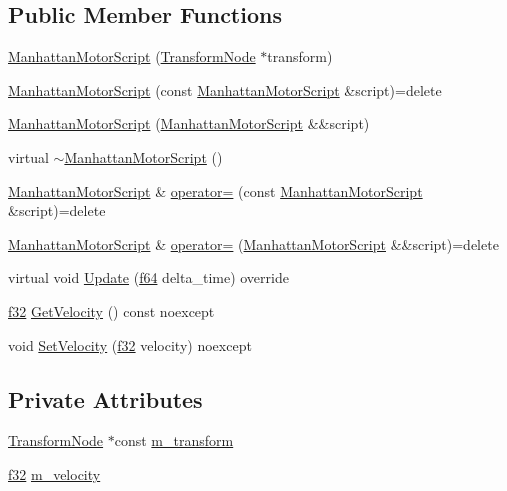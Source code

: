 \subsection*{Public Member Functions}
\begin{DoxyCompactItemize}
\item 
\hyperlink{classmage_1_1_manhattan_motor_script_a6a40360d3b1603e8e5fc64a230ed7574}{Manhattan\+Motor\+Script} (\hyperlink{structmage_1_1_transform_node}{Transform\+Node} $\ast$transform)
\item 
\hyperlink{classmage_1_1_manhattan_motor_script_a890f4456d4707e6eb33e43837b26e536}{Manhattan\+Motor\+Script} (const \hyperlink{classmage_1_1_manhattan_motor_script}{Manhattan\+Motor\+Script} \&script)=delete
\item 
\hyperlink{classmage_1_1_manhattan_motor_script_ae573b594372f184a524c6c9f35517fae}{Manhattan\+Motor\+Script} (\hyperlink{classmage_1_1_manhattan_motor_script}{Manhattan\+Motor\+Script} \&\&script)
\item 
virtual \hyperlink{classmage_1_1_manhattan_motor_script_a86d4f8c4ba0aa94358ea2bc77f9a2a69}{$\sim$\+Manhattan\+Motor\+Script} ()
\item 
\hyperlink{classmage_1_1_manhattan_motor_script}{Manhattan\+Motor\+Script} \& \hyperlink{classmage_1_1_manhattan_motor_script_a563d4d429bbcabf25f57539857dde53c}{operator=} (const \hyperlink{classmage_1_1_manhattan_motor_script}{Manhattan\+Motor\+Script} \&script)=delete
\item 
\hyperlink{classmage_1_1_manhattan_motor_script}{Manhattan\+Motor\+Script} \& \hyperlink{classmage_1_1_manhattan_motor_script_a944149dc06764bc23feffde4de100679}{operator=} (\hyperlink{classmage_1_1_manhattan_motor_script}{Manhattan\+Motor\+Script} \&\&script)=delete
\item 
virtual void \hyperlink{classmage_1_1_manhattan_motor_script_a7d342e8c4a83aaebe3c8eaaacb65d167}{Update} (\hyperlink{namespacemage_ab935747c6941320bd6214b5a5f265b09}{f64} delta\+\_\+time) override
\item 
\hyperlink{namespacemage_a6a44ad388483959dc4dff9f2aef91431}{f32} \hyperlink{classmage_1_1_manhattan_motor_script_a13ca79b06da387a4bb44c5201d0cab07}{Get\+Velocity} () const noexcept
\item 
void \hyperlink{classmage_1_1_manhattan_motor_script_a377aef19004473a9702f5275f8a26bb5}{Set\+Velocity} (\hyperlink{namespacemage_a6a44ad388483959dc4dff9f2aef91431}{f32} velocity) noexcept
\end{DoxyCompactItemize}
\subsection*{Private Attributes}
\begin{DoxyCompactItemize}
\item 
\hyperlink{structmage_1_1_transform_node}{Transform\+Node} $\ast$const \hyperlink{classmage_1_1_manhattan_motor_script_a87af31ce6376830ed040b19d78da386e}{m\+\_\+transform}
\item 
\hyperlink{namespacemage_a6a44ad388483959dc4dff9f2aef91431}{f32} \hyperlink{classmage_1_1_manhattan_motor_script_ae7a94b156266f2e6b70318248e9fba1f}{m\+\_\+velocity}
\end{DoxyCompactItemize}
